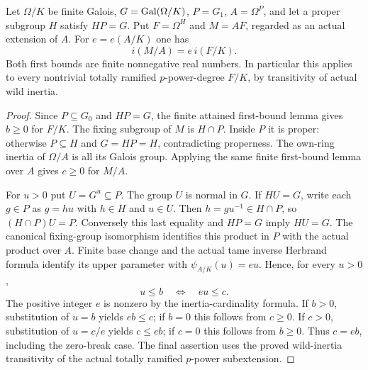 \begin{lemma}
\label{fw:wild-compositum-first-bound}
\leanok
Let $\Omega/K$ be finite Galois, $G=\operatorname{Gal}(\Omega/K)$,
$P=G_1$, $A=\Omega^P$, and let a proper subgroup $H$ satisfy
$HP=G$. Put $F=\Omega^H$ and $M=AF$, regarded as an actual
extension of $A$. For $e=e(A/K)$ one has
\[
 i(M/A)=e\,i(F/K).
\]
Both first bounds are finite nonnegative real numbers. In particular
this applies to every nontrivial totally ramified $p$-power-degree
$F/K$, by transitivity of actual wild inertia.
\end{lemma}
\begin{proof}
Since $P\subseteq G_0$ and $HP=G$, the finite attained first-bound
lemma gives $b\geq0$ for $F/K$. The fixing subgroup of $M$ is
$H\cap P$. Inside $P$ it is proper: otherwise $P\subseteq H$
and $G=HP=H$, contradicting properness. The own-ring inertia of
$\Omega/A$ is all its Galois group. Applying the same finite
first-bound lemma over $A$ gives $c\geq0$ for $M/A$.

For $u>0$ put $U=G^u\subseteq P$. The group $U$ is normal in
$G$. If $HU=G$, write each $g\in P$ as $g=hu$ with $h\in H$
and $u\in U$. Then $h=gu^{-1}\in H\cap P$, so
$(H\cap P)U=P$. Conversely this last equality and $HP=G$
imply $HU=G$. The canonical fixing-group isomorphism identifies
this product in $P$ with the actual product over $A$. Finite base
change and the actual tame inverse Herbrand formula identify its
upper parameter with $\psi_{A/K}(u)=eu$. Hence, for every $u>0$,
\[
 u\leq b\quad\Longleftrightarrow\quad eu\leq c.
\]
The positive integer $e$ is nonzero by the inertia-cardinality
formula. If $b>0$, substitution of $u=b$ yields $eb\leq c$;
if $b=0$ this follows from $c\geq0$. If $c>0$, substitution of
$u=c/e$ yields $c\leq eb$; if $c=0$ this follows from $b\geq0$.
Thus $c=eb$, including the zero-break case. The final assertion
uses the proved wild-inertia transitivity of the actual totally
ramified $p$-power subextension.
\end{proof}


